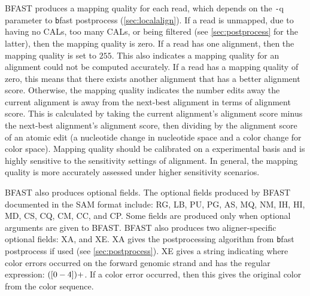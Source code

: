 \documentclass[a4paper,12pt]{book}
\newcommand{\TT}[1]{{\tt #1}} %
\begin{document}
BFAST produces a mapping quality for each read, which depends on the {\TT -q} parameter to {\TT bfast postprocess} (\autoref{sec:localalign}).
If a read is unmapped, due to having no CALs, too many CALs, or being filtered (see \autoref{sec:postprocess} for the latter), then the mapping quality is zero.
If a read has one alignment, then the mapping quality is set to $255$.
This also indicates a mapping quality for an alignment could not be computed accurately.
If a read has a mapping quality of zero, this means that there exists another alignment that has a better alignment score.
Otherwise, the mapping quality indicates the number edits away the current alignment is away from the next-best alignment in terms of alignment score.
This is calculated by taking the current alignment's alignment score minus the next-best alignment's alignment score, then dividing by the alignment score of an atomic edit (a nucleotide change in nucleotide space and a color change for color space). 
Mapping quality should be calibrated on a experimental basis and is highly sensitive to the sensitivity settings of alignment.
In general, the mapping quality is more accurately assessed under higher sensitivity scenarios.

BFAST also produces optional fields.
The optional fields produced by BFAST documented in the SAM format include: RG, LB, PU, PG, AS, MQ, NM, IH, HI, MD, CS, CQ, CM, CC, and CP.
Some fields are produced only when optional arguments are given to BFAST.
BFAST also produces two aligner-specific optional fields: XA, and XE.
XA gives the postprocessing algorithm from {\TT bfast postprocess} if used (see \autoref{sec:postprocess}).
XE gives a string indicating where color errors occurred on the forward genomic strand and has the regular expression: $([0-4\-])+$.
If a color error occurred, then this gives the original color from the color sequence.
\end{document}
